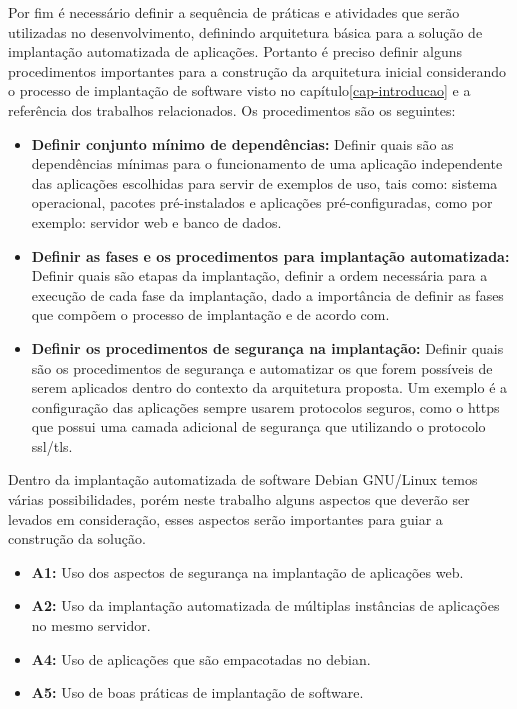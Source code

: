 Por fim é necessário definir a  sequência de práticas  e atividades que serão
utilizadas no desenvolvimento, definindo arquitetura básica para a solução de
implantação automatizada de aplicações. Portanto é preciso definir alguns
procedimentos importantes para a construção da arquitetura inicial considerando
o processo de implantação de software visto no capítulo\ref{cap-introducao}
e a referência dos trabalhos relacionados. Os procedimentos são os seguintes:

\begin{itemize}
  \item  \textbf{Definir conjunto mínimo de dependências:} Definir quais são as dependências
  mínimas para o funcionamento de uma aplicação independente das aplicações escolhidas para
  servir de exemplos de uso, tais como: sistema operacional, pacotes pré-instalados
  e aplicações pré-configuradas, como por exemplo: servidor web e banco de dados.
  \item  \textbf{Definir as fases e os procedimentos para implantação automatizada:}
   Definir quais são etapas da implantação, definir a ordem necessária para a execução de
  cada fase da implantação, dado a importância de definir as fases que compõem o processo de
  implantação e de acordo com\cite{omg2006}.
  \item  \textbf{Definir os procedimentos de segurança na implantação:} Definir
  quais são os procedimentos de segurança e automatizar os que forem possíveis
  de serem aplicados dentro do contexto da arquitetura proposta. Um exemplo
  é a configuração das aplicações sempre usarem protocolos seguros, como o https
  que possui uma camada adicional de segurança que utilizando o protocolo ssl/tls.
\end{itemize}

Dentro da implantação automatizada de software Debian GNU/Linux temos várias
possibilidades, porém neste trabalho alguns aspectos que deverão ser levados em
consideração, esses aspectos serão importantes para guiar a construção da solução.

\begin{itemize}
  \item  \textbf{A1:} Uso dos aspectos de segurança na implantação de aplicações web.
  \item  \textbf{A2:} Uso da implantação automatizada de múltiplas instâncias de
   aplicações no mesmo servidor.
  \item  \textbf{A4:} Uso de aplicações que são empacotadas no debian.
  \item  \textbf{A5:} Uso de boas práticas de implantação de software.
\end{itemize}

